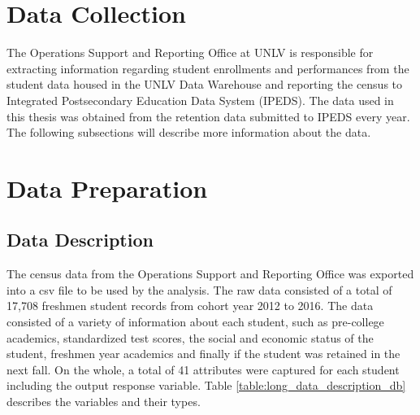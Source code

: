 \documentclass[11pt,openright]{report}
\begin{document}
\section{Data Collection}

The Operations Support and Reporting Office at UNLV is responsible for extracting information regarding student enrollments and performances from the student data housed in the UNLV Data Warehouse and reporting the census to Integrated Postsecondary Education Data System (IPEDS). The data used in this thesis was obtained from the retention data submitted to IPEDS every year. The following subsections will describe more information about the data.

\section {Data Preparation}
\subsection{Data Description}
The census data from the Operations Support and Reporting Office was exported into a csv file to be used by the analysis. The raw data consisted of a total of 17,708 freshmen student records from cohort year 2012 to 2016. The data consisted of a variety of information about each student, such as pre-college academics, standardized test scores, the social and economic status of the student, freshmen year academics and finally if the student was retained in the next fall. On the whole, a total of 41 attributes were captured for each student including the output response variable. Table \ref{table:long_data_description_db} describes the variables and their types. 
\end{document}
